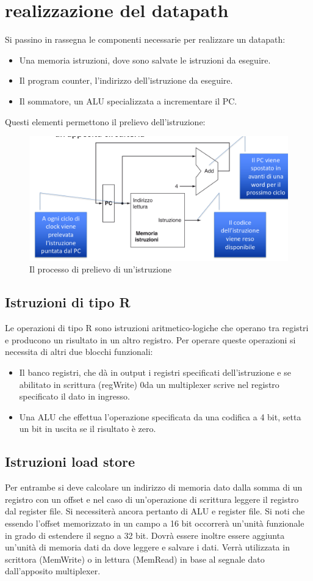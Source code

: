 \section{realizzazione del datapath}
Si passino in rassegna le componenti necessarie per realizzare un datapath:
\begin{itemize}
\item Una memoria istruzioni, dove sono salvate le istruzioni da eseguire.
\item Il program counter, l'indirizzo dell'istruzione da eseguire.
\item Il sommatore, un ALU specializzata a incrementare il PC. 
\end{itemize}
Questi elementi permettono il prelievo dell'istruzione:
\newpage
\begin{figure}
  \includegraphics[scale=0.2]{Pictures/PrelievoIstruzione.png}
  \caption{Il processo di prelievo di un'istruzione}
  \label{fig:boat1}
\end{figure}
\subsection{Istruzioni di tipo R}
Le operazioni di tipo R sono istruzioni aritmetico-logiche che operano tra registri e producono un risultato in un altro registro. Per operare queste operazioni si
necessita di altri due blocchi funzionali:
\begin{itemize}
\item Il banco registri, che d\`a in output i registri specificati dell'istruzione e se abilitato in scrittura (regWrite) 0da un multiplexer scrive nel registro 
specificato il dato in ingresso.
\item Una ALU che effettua l'operazione specificata da una codifica a 4 bit, setta un bit in uscita se il risultato \`e zero.
\end{itemize}
\subsection{Istruzioni load store}
Per entrambe si deve calcolare un indirizzo di memoria dato dalla somma di un registro con un offset e nel caso di un'operazione di scrittura leggere il registro dal 
register file. Si necessiter\`a ancora pertanto di ALU e register file. Si noti che essendo l'offset memorizzato in un campo a 16 bit occorrer\`a un'unit\`a funzionale
in grado di estendere il segno a 32 bit. Dovr\`a essere inoltre essere aggiunta un'unit\`a di memoria dati da dove leggere e salvare i dati. Verr\`a utilizzata in 
scrittora (MemWrite) o in lettura (MemRead) in base al segnale dato dall'apposito multiplexer. 
